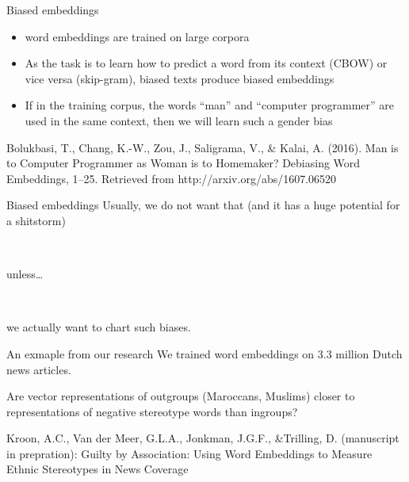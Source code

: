 \documentclass{beamer}
\begin{document}
\begin{frame}{Biased embeddings}
\begin{itemize}
	\item word embeddings are trained on large corpora
	\item As the task is to learn how to predict a word from its context (CBOW) or vice versa (skip-gram), biased texts produce biased embeddings
	\item If in the training corpus, the words ``man'' and ``computer programmer'' are used in the same context, then we will learn such a gender bias
\end{itemize}

\tiny{Bolukbasi, T., Chang, K.-W., Zou, J., Saligrama, V., \& Kalai, A. (2016). Man is to Computer Programmer as Woman is to Homemaker? Debiasing Word Embeddings, 1–25. Retrieved from http://arxiv.org/abs/1607.06520}
\end{frame}


\begin{frame}{Biased embeddings}
Usually, we do not want that (and it has a huge potential for a shitstorm)

~\\
\pause

unless\ldots

~\\
\pause

we actually want to chart such biases.

\end{frame}


\begin{frame}{An exmaple from our research}
We trained word embeddings on 3.3 million Dutch news articles.

Are vector representations of outgroups (Maroccans, Muslims) closer to representations of negative stereotype words than ingroups?
\vspace{.5cm}

\tiny{Kroon, A.C., Van der Meer, G.L.A., Jonkman, J.G.F., \&Trilling, D. (manuscript in prepration): Guilty by Association: Using Word Embeddings to Measure Ethnic Stereotypes in News Coverage}
\end{frame}
\end{document}
